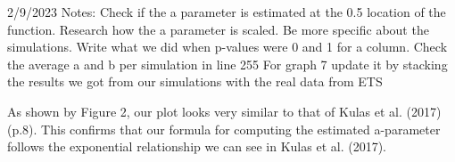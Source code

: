 \documentclass[
  jou]{apa6}
\begin{document}
2/9/2023 Notes: Check if the a parameter is estimated at the 0.5 location of the function. Research how the a parameter is scaled.
Be more specific about the simulations. Write what we did when p-values were 0 and 1 for a column.
Check the average a and b per simulation in line 255
For graph 7 update it by stacking the results we got from our simulations with the real data from ETS

As shown by Figure 2, our plot looks very similar to that of Kulas et al. (2017) (p.8). This confirms that our formula for computing the estimated a-parameter follows the exponential relationship we can see in Kulas et al. (2017).
\end{document}
